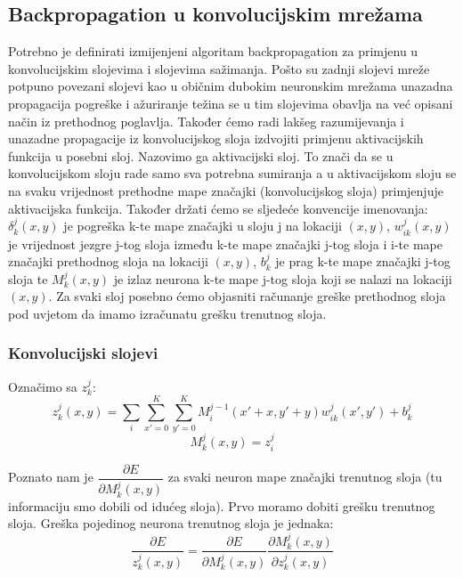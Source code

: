 \documentclass[times, utf8, zavrsni]{fer}
\begin{document}
\subsection{Backpropagation u konvolucijskim mrežama}
Potrebno je definirati izmijenjeni algoritam backpropagation za primjenu u konvolucijskim slojevima i slojevima sažimanja. Pošto su zadnji slojevi mreže potpuno povezani slojevi kao u običnim dubokim neuronskim mrežama unazadna propagacija pogreške i ažuriranje težina se u tim slojevima obavlja na već opisani način iz prethodnog poglavlja. Također ćemo radi lakšeg razumijevanja i unazadne propagacije iz konvolucijskog sloja izdvojiti primjenu aktivacijskih funkcija u posebni sloj. Nazovimo ga aktivacijski sloj. To znači da se u konvolucijskom sloju rade samo sva potrebna sumiranja a u aktivacijskom sloju se na svaku vrijednost prethodne mape značajki (konvolucijskog sloja) primjenjuje aktivacijska funkcija. Također držati ćemo se sljedeće konvencije imenovanja: $\delta_k^j (x, y)$ je pogreška k-te mape značajki u sloju j na lokaciji $(x, y)$, $w^j_{ik} (x, y)$ je vrijednost jezgre j-tog sloja između k-te mape značajki j-tog sloja i i-te mape značajki prethodnog sloja na lokaciji $(x, y)$, $b^j_k$ je prag k-te mape značajki j-tog sloja te $M_k^j (x, y)$ je izlaz neurona k-te mape j-tog sloja koji se nalazi na lokaciji $(x, y)$. Za svaki sloj posebno ćemo objasniti računanje greške prethodnog sloja pod uvjetom da imamo izračunatu grešku trenutnog sloja.

\subsubsection{Konvolucijski slojevi}
Označimo sa $z_k^j$:
\begin{equation}
z^j_k (x, y) = \sum_i \sum_{x'=0}^K \sum_{y'=0}^K M^{j-1}_i (x' + x, y' + y) w^j_{ik} (x', y') + b^j_k
\end{equation}
\begin{equation}\label{eq:m=z}
M^j_k (x, y) = z^j_i
\end{equation}

Poznato nam je $\dfrac{\partial E}{\partial M^j_k (x, y)}$ za svaki neuron mape značajki trenutnog sloja (tu informaciju smo dobili od idućeg sloja). Prvo moramo dobiti grešku trenutnog sloja. Greška pojedinog neurona trenutnog sloja je jednaka: 
\begin{equation}
\dfrac{\partial E}{z^j_k (x, y)} = \dfrac{\partial E}{\partial M^j_k (x, y)} \dfrac{\partial M^j_k (x, y)}{\partial z^j_k (x, y)}
\end{equation}
\end{document}
